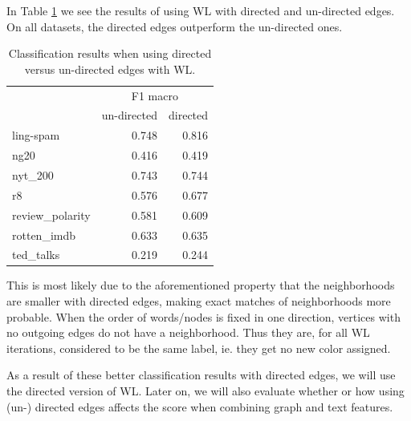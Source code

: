 In Table \ref{table:results_directed_vs_undirected} we see the results of using WL with directed and un-directed edges.
On all datasets, the directed edges outperform the un-directed ones.

\begin{table}[htb!]
	\centering
\begin{tabular}{lrr}
\toprule
	&  \multicolumn{2}{c}{F1 macro} \\
	 &  un-directed & directed \\
	\midrule
ling-spam       & 0.748 & 0.816 \\
ng20            & 0.416 & 0.419 \\
nyt\_200         & 0.743 & 0.744 \\
r8              & 0.576 & 0.677 \\
review\_polarity & 0.581 & 0.609 \\
rotten\_imdb     & 0.633 & 0.635 \\
ted\_talks       & 0.219 & 0.244 \\
	\bottomrule
\end{tabular}
\caption[Results: WL with directed and un-directed edges]{Classification results when using directed versus un-directed edges with WL.}\label{table:results_directed_vs_undirected}
\end{table}

This is most likely due to the aforementioned property that the neighborhoods are smaller with directed edges, making exact matches of neighborhoods more probable.
When the order of words/nodes is fixed in one direction, vertices with no outgoing edges do not have a neighborhood. Thus they are, for all WL iterations, considered to be the same label, ie. they get no new color assigned.

As a result of these better classification results with directed edges, we will use the directed version of WL.
Later on, we will also evaluate whether or how using (un-) directed edges affects the score when combining graph and text features.



